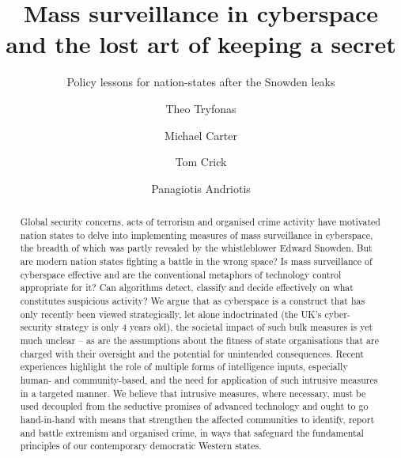 \documentclass{llncs}
\begin{document}
\title{Mass surveillance in cyberspace and the lost art of keeping a secret}
\subtitle{Policy lessons for nation-states after the Snowden leaks}

\author{Theo Tryfonas \and Michael Carter \and Tom Crick \and Panagiotis Andriotis}

\maketitle

\begin{abstract}
Global security concerns, acts of terrorism and organised crime activity have motivated nation states to delve into implementing measures of mass surveillance in cyberspace, the breadth of which was partly revealed by the whistleblower Edward Snowden. But are modern nation states fighting a battle in the wrong space? Is mass surveillance of cyberspace effective and are the conventional metaphors of technology control appropriate for it? Can algorithms detect, classify and decide effectively on what constitutes suspicious activity? We argue that as cyberspace is a construct that has only recently been viewed strategically, let alone indoctrinated (the UK’s cyber-security strategy is only 4 years old), the societal impact of such bulk measures is yet much unclear – as are the assumptions about the fitness of state organisations that are charged with their oversight and the potential for unintended consequences. Recent experiences highlight the role of multiple forms of intelligence inputs, especially human- and community-based, and the need for application of such intrusive measures in a targeted manner. We believe that intrusive measures, where necessary, must be used decoupled from the seductive promises of advanced technology and ought to go hand-in-hand with means that strengthen the affected communities to identify, report and battle extremism and organised crime, in ways that safeguard the fundamental principles of our contemporary democratic Western states.
\end{abstract}
\end{document}
